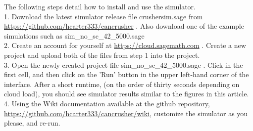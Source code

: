 The following steps detail how to install and use the simulator.
\\
1.  Download the latest simulator release file crushersim.sage from \url{https://github.com/hcarter333/cancrusher} .  Also download one of the example simulations such as sim\_no\_sc\_42\_5000.sage
\\
2.  Create an account for yourself at \url{https://cloud.sagemath.com} .  Create a new project and upload both of the files from step 1 into the project.
\\
3.  Open the newly created project file sim\_no\_sc\_42\_5000.sage .  Click in the first cell, and then click on the 'Run' button in the upper left-hand corner of the interface.  After a short runtime, (on the order of thirty seconds depending on cloud load), you should see simulator results similar to the figures in this article.
\\
4.  Using the Wiki documentation available at the github repository, \url{https://github.com/hcarter333/cancrusher/wiki}, customize the simulator as you please, and re-run.
